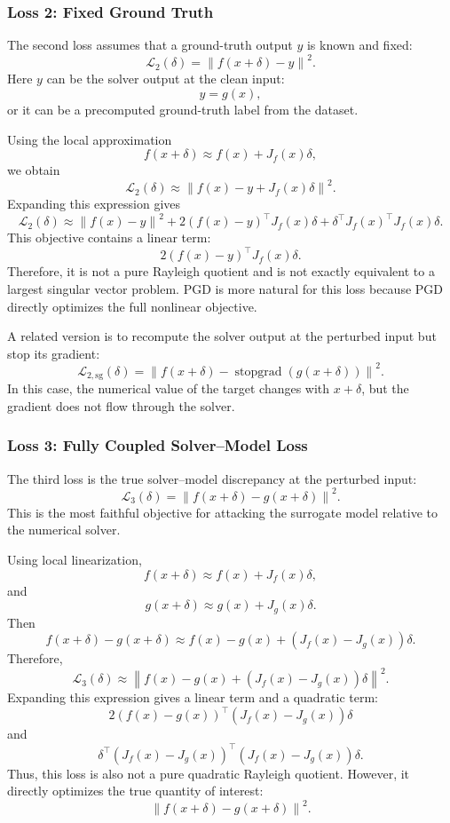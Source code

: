 \documentclass{article}
\begin{document}
\subsubsection{Loss 2: Fixed Ground Truth}

The second loss assumes that a ground-truth output \(y\) is known and fixed:
\[
\mathcal{L}_2(\delta)
=
\left\|
f(x+\delta)-y
\right\|^2.
\]
Here \(y\) can be the solver output at the clean input:
\[
y = g(x),
\]
or it can be a precomputed ground-truth label from the dataset.

Using the local approximation
\[
f(x+\delta)
\approx
f(x)+J_f(x)\delta,
\]
we obtain
\[
\mathcal{L}_2(\delta)
\approx
\left\|
f(x)-y+J_f(x)\delta
\right\|^2.
\]
Expanding this expression gives
\[
\mathcal{L}_2(\delta)
\approx
\left\|
f(x)-y
\right\|^2
+
2(f(x)-y)^\top J_f(x)\delta
+
\delta^\top J_f(x)^\top J_f(x)\delta.
\]
This objective contains a linear term:
\[
2(f(x)-y)^\top J_f(x)\delta.
\]
Therefore, it is not a pure Rayleigh quotient and is not exactly equivalent to a largest singular vector problem. PGD is more natural for this loss because PGD directly optimizes the full nonlinear objective.

A related version is to recompute the solver output at the perturbed input but stop its gradient:
\[
\mathcal{L}_{2,\mathrm{sg}}(\delta)
=
\left\|
f(x+\delta)
-
\operatorname{stopgrad}(g(x+\delta))
\right\|^2.
\]
In this case, the numerical value of the target changes with \(x+\delta\), but the gradient does not flow through the solver.

\subsubsection{Loss 3: Fully Coupled Solver--Model Loss}

The third loss is the true solver--model discrepancy at the perturbed input:
\[
\mathcal{L}_3(\delta)
=
\left\|
f(x+\delta)-g(x+\delta)
\right\|^2.
\]
This is the most faithful objective for attacking the surrogate model relative to the numerical solver.

Using local linearization,
\[
f(x+\delta)
\approx
f(x)+J_f(x)\delta,
\]
and
\[
g(x+\delta)
\approx
g(x)+J_g(x)\delta.
\]
Then
\[
f(x+\delta)-g(x+\delta)
\approx
f(x)-g(x)
+
\left(J_f(x)-J_g(x)\right)\delta.
\]
Therefore,
\[
\mathcal{L}_3(\delta)
\approx
\left\|
f(x)-g(x)
+
\left(J_f(x)-J_g(x)\right)\delta
\right\|^2.
\]
Expanding this expression gives a linear term and a quadratic term:
\[
2(f(x)-g(x))^\top
\left(J_f(x)-J_g(x)\right)\delta
\]
and
\[
\delta^\top
\left(J_f(x)-J_g(x)\right)^\top
\left(J_f(x)-J_g(x)\right)
\delta.
\]
Thus, this loss is also not a pure quadratic Rayleigh quotient. However, it directly optimizes the true quantity of interest:
\[
\left\|
f(x+\delta)-g(x+\delta)
\right\|^2.
\]
\end{document}
